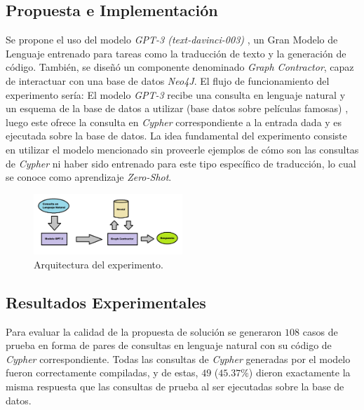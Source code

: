 \documentclass[a4paper,10pt,twocolumn]{article}
\begin{document}
\subsection{Propuesta e Implementación}
Se propone el uso del modelo \textit{GPT-3 (text-davinci-003)} \cite{gpt3}, un Gran Modelo de Lenguaje entrenado para tareas como la traducción de texto y la generación de código. También, se diseñó un componente denominado \textit{Graph Contractor}, capaz de interactuar con una base de datos \textit{Neo4J}. El flujo de funcionamiento del experimento sería: El modelo \textit{GPT-3} recibe una consulta en lenguaje natural y un esquema \cite{dbschema} de la base de datos a utilizar (base datos sobre películas famosas) \cite{moviesdb}, luego este ofrece la consulta en \textit{Cypher} correspondiente a la entrada dada y es ejecutada sobre la base de datos. La idea fundamental del experimento consiste en utilizar el modelo mencionado sin proveerle ejemplos de cómo son las consultas de \textit{Cypher} ni haber sido entrenado para este tipo específico de traducción, lo cual se conoce como aprendizaje \textit{Zero-Shot}.

\begin{figure}[h!]
\includegraphics[width=0.5\textwidth]{img/architecture.png}
\caption{Arquitectura del experimento.}\label{img:arch}
\end{figure}

\subsection{Resultados Experimentales}
Para evaluar la calidad de la propuesta de solución se generaron $108$ casos de prueba en forma de pares de consultas en lenguaje natural con su código de \textit{Cypher} correspondiente. Todas las consultas de \textit{Cypher} generadas por el modelo fueron correctamente compiladas, y  de estas, $49$ ($45.37\%$) dieron exactamente la misma respuesta que las consultas de prueba al ser ejecutadas sobre la base de datos.
\end{document}
